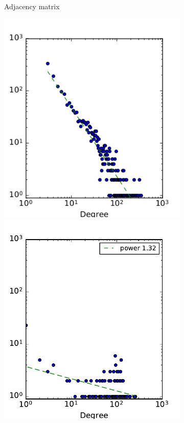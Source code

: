 \begin{figure}[h]
\begin{subfigure}[b]{0.400\textwidth}
            \caption {{\small Adjacency matrix}}    
            \label{fig:mean and std of net14}
        \end{subfigure}
        \quad
        \begin{subfigure}[b]{0.400\textwidth}  
            \centering 
            \includegraphics[scale=0.32]{img/irvine_d}
            \includegraphics[scale=0.32]{img/manufacturing_d}

\end{subfigure}
\end{figure}

